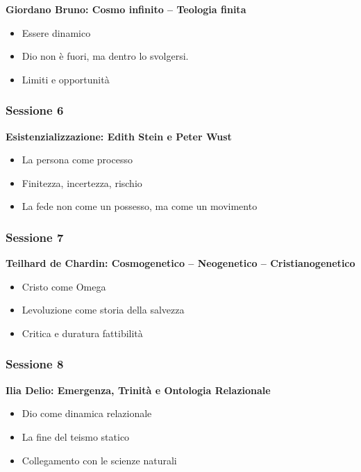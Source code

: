 \documentclass[
]{article}
\begin{document}
\textbf{Giordano Bruno: Cosmo infinito -- Teologia finita}

\begin{itemize}
\item
  Essere dinamico
\item
  Dio non è fuori, ma dentro lo svolgersi.
\item
  Limiti e opportunità
\end{itemize}

\subsubsection{\texorpdfstring{\textbf{Sessione 6}}{Sessione 6}}\label{sessione-6}

\textbf{Esistenzializzazione: Edith Stein e Peter Wust}

\begin{itemize}
\item
  La persona come processo
\item
  Finitezza, incertezza, rischio
\item
  La fede non come un possesso, ma come un movimento
\end{itemize}

\subsubsection{\texorpdfstring{\textbf{Sessione 7}}{Sessione 7}}\label{sessione-7}

\textbf{Teilhard de Chardin: Cosmogenetico -- Neogenetico -- Cristianogenetico}

\begin{itemize}
\item
  Cristo come Omega
\item
  L\textquotesingle evoluzione come storia della salvezza
\item
  Critica e duratura fattibilità
\end{itemize}

\subsubsection{\texorpdfstring{\textbf{Sessione 8}}{Sessione 8}}\label{sessione-8}

\textbf{Ilia Delio: Emergenza, Trinità e Ontologia Relazionale}

\begin{itemize}
\item
  Dio come dinamica relazionale
\item
  La fine del teismo statico
\item
  Collegamento con le scienze naturali
\end{itemize}
\end{document}
